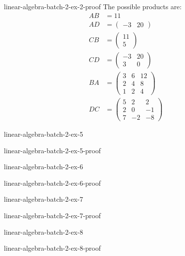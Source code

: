 \documentclass[preview]{standalone}
\begin{document}
\begin{snippetsolution}{linear-algebra-batch-2-ex-2-proof}{}
    The possible products are:
    \begin{align*}
        AB &= 11 \\
        AD &= \begin{pmatrix}-3 & 20\end{pmatrix} \\
        CB &= \begin{pmatrix}11 \\ 5\end{pmatrix} \\
        CD &= \begin{pmatrix}-3 & 20 \\ 3 & 0\end{pmatrix} \\
        BA &= \begin{pmatrix}3 & 6 & 12 \\ 2 & 4 & 8 \\ 1 & 2 & 4\end{pmatrix} \\
        DC &= \begin{pmatrix}5 & 2 & 2 \\ 2 & 0 & -1 \\ 7 & -2 & -8\end{pmatrix}
    \end{align*}
\end{snippetsolution}

\begin{snippetexercise}{linear-algebra-batch-2-ex-5}{}
    \todo
\end{snippetexercise}

\begin{snippetsolution}{linear-algebra-batch-2-ex-5-proof}{}
    \todo
\end{snippetsolution}

\begin{snippetexercise}{linear-algebra-batch-2-ex-6}{}
    \todo
\end{snippetexercise}

\begin{snippetsolution}{linear-algebra-batch-2-ex-6-proof}{}
    \todo
\end{snippetsolution}

\begin{snippetexercise}{linear-algebra-batch-2-ex-7}{}
    \todo
\end{snippetexercise}

\begin{snippetsolution}{linear-algebra-batch-2-ex-7-proof}{}
    \todo
\end{snippetsolution}

\begin{snippetexercise}{linear-algebra-batch-2-ex-8}{}
    \todo
\end{snippetexercise}

\begin{snippetsolution}{linear-algebra-batch-2-ex-8-proof}{}
    \todo
\end{snippetsolution}
\end{document}
